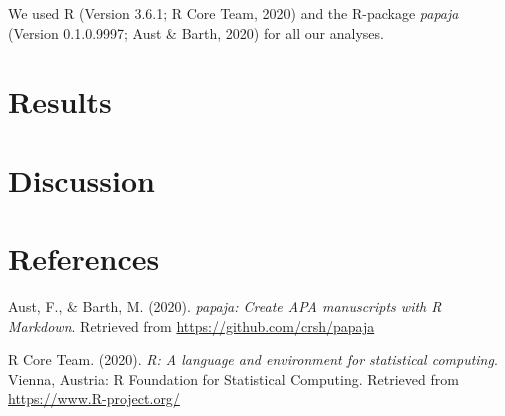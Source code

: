 \documentclass[
  english,
  man]{apa6}
\begin{document}
We used R (Version 3.6.1; R Core Team, 2020) and the R-package \emph{papaja} (Version 0.1.0.9997; Aust \& Barth, 2020) for all our analyses.

\hypertarget{results-1}{%
\section{Results}\label{results-1}}

\hypertarget{discussion}{%
\section{Discussion}\label{discussion}}

\newpage

\hypertarget{references}{%
\section{References}\label{references}}

\begingroup
\setlength{\parindent}{-0.5in}
\setlength{\leftskip}{0.5in}

\hypertarget{refs}{}
\leavevmode\hypertarget{ref-R-papaja}{}%
Aust, F., \& Barth, M. (2020). \emph{papaja: Create APA manuscripts with R Markdown}. Retrieved from \url{https://github.com/crsh/papaja}

\leavevmode\hypertarget{ref-R-base}{}%
R Core Team. (2020). \emph{R: A language and environment for statistical computing}. Vienna, Austria: R Foundation for Statistical Computing. Retrieved from \url{https://www.R-project.org/}

\endgroup
\end{document}
